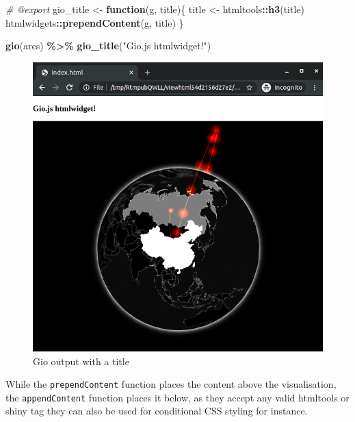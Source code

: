\documentclass[
]{krantz}
\makeatletter
\newenvironment{Shaded}{\begin{snugshade}}{\end{snugshade}}
\newcommand{\CommentTok}[1]{\textcolor[rgb]{0.37,0.37,0.37}{\textit{#1}}}
\newcommand{\ControlFlowTok}[1]{\textcolor[rgb]{0.27,0.27,0.27}{\textbf{#1}}}
\newcommand{\KeywordTok}[1]{\textcolor[rgb]{0.27,0.27,0.27}{\textbf{#1}}}
\newcommand{\NormalTok}[1]{#1}
\newcommand{\OperatorTok}[1]{\textcolor[rgb]{0.43,0.43,0.43}{\textbf{#1}}}
\newcommand{\StringTok}[1]{\textcolor[rgb]{0.5,0.5,0.5}{#1}}
\newenvironment{kframe}{%
\medskip{}
\setlength{\fboxsep}{.8em}
 \def\at@end@of@kframe{}%
 \ifinner\ifhmode%
  \def\at@end@of@kframe{\end{minipage}}%
  \begin{minipage}{\columnwidth}%
 \fi\fi%
 \def\FrameCommand##1{\hskip\@totalleftmargin \hskip-\fboxsep
 \colorbox{shadecolor}{##1}\hskip-\fboxsep
     \hskip-\linewidth \hskip-\@totalleftmargin \hskip\columnwidth}%
 \MakeFramed {\advance\hsize-\width
   \@totalleftmargin\z@ \linewidth\hsize
   \@setminipage}}%
 {\par\unskip\endMakeFramed%
 \at@end@of@kframe}
\renewenvironment{Shaded}{\begin{kframe}}{\end{kframe}}
\makeatother
\begin{document}
\begin{Shaded}
\begin{Highlighting}[]
\CommentTok{\#\textquotesingle{} @export}
\NormalTok{gio\_title <{-}}\StringTok{ }\ControlFlowTok{function}\NormalTok{(g, title)\{}
\NormalTok{  title <{-}}\StringTok{ }\NormalTok{htmltools}\OperatorTok{::}\KeywordTok{h3}\NormalTok{(title)}
\NormalTok{  htmlwidgets}\OperatorTok{::}\KeywordTok{prependContent}\NormalTok{(g, title)}
\NormalTok{\}}
\end{Highlighting}
\end{Shaded}

\begin{Shaded}
\begin{Highlighting}[]
\KeywordTok{gio}\NormalTok{(arcs) }\OperatorTok{\%>\%}\StringTok{ }
\StringTok{  }\KeywordTok{gio\_title}\NormalTok{(}\StringTok{"Gio.js htmlwidget!"}\NormalTok{)}
\end{Highlighting}
\end{Shaded}

\begin{figure}
\centering
\includegraphics{images/gio-title.png}
\caption{Gio output with a title}
\end{figure}

While the \texttt{prependContent} function places the content above the visualisation, the \texttt{appendContent} function places it below, as they accept any valid htmltools or shiny tag they can also be used for conditional CSS styling for instance.
\end{document}
